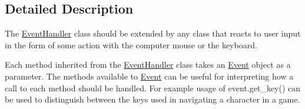 \subsection{Detailed Description}
The \mbox{\hyperlink{classcs110graphics__v2_1_1EventHandler}{Event\+Handler}} class should be extended by any class that reacts to user input in the form of some action with the computer mouse or the keyboard. 

Each method inherited from the \mbox{\hyperlink{classcs110graphics__v2_1_1EventHandler}{Event\+Handler}} class takes an \mbox{\hyperlink{classcs110graphics__v2_1_1Event}{Event}} object as a parameter. The methods available to \mbox{\hyperlink{classcs110graphics__v2_1_1Event}{Event}} can be useful for interpreting how a call to each method should be handled. For example usage of event.\+get\+\_\+key() can be used to distinguish between the keys used in navigating a character in a game.

